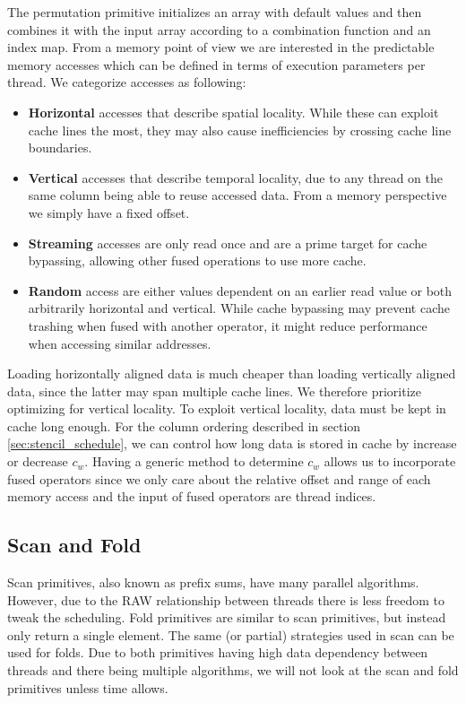 \documentclass{article}
\newcommand{\TODO}[1]{\noindent{\color{red}\textbf{[TODO] #1}}}
\begin{document}
The permutation primitive initializes an array with default values and then combines it with the input array according to a combination function and an index map.
From a memory point of view we are interested in the predictable memory accesses which can be defined in terms of execution parameters per thread.
We categorize accesses as following:
\begin{itemize}
    \item \textbf{Horizontal} accesses that describe spatial locality. 
    While these can exploit cache lines the most, they may also cause inefficiencies by crossing cache line boundaries.
    
    \item \textbf{Vertical} accesses that describe temporal locality, due to any thread on the same column being able to reuse accessed data. From a memory perspective we simply have a fixed offset.
    
    \item \textbf{Streaming} accesses are only read once and are a prime target for cache bypassing, allowing other fused operations to use more cache.
    
    \item \textbf{Random} access are either values dependent on an earlier read value or both arbitrarily horizontal and vertical. While cache bypassing may prevent cache trashing when fused with another operator, it might reduce performance when accessing similar addresses.
\end{itemize}
Loading horizontally aligned data is much cheaper than loading vertically aligned data, since the latter may span multiple cache lines.
We therefore prioritize optimizing for vertical locality.
To exploit vertical locality, data must be kept in cache long enough.
For the column ordering described in section \ref{sec:stencil_schedule}, we can control how long data is stored in cache by increase or decrease $c_w$.
Having a generic method to determine $c_w$ allows us to incorporate fused operators since we only care about the relative offset and range of each memory access and the input of fused operators are thread indices.
\TODO{Incorporate citations}
\citet{balen2020optimal}
\citet{mcdonell2013optimising}

\subsection{Scan and Fold}
Scan primitives, also known as prefix sums, have many parallel algorithms.
However, due to the RAW relationship between threads there is less freedom to tweak the scheduling.
Fold primitives are similar to scan primitives, but instead only return a single element.
The same (or partial) strategies used in scan can be used for folds.
Due to both primitives having high data dependency between threads and there being multiple algorithms, we will not look at the scan and fold primitives unless time allows.
\end{document}
